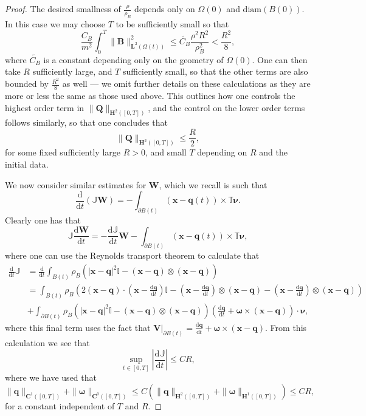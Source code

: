 \documentclass[a4paper]{amsart}
\numberwithin{equation}{section}
\theoremstyle{plain}
\newcommand{\mbf}[1]{\mathbf{#1}}
\newcommand{\mbb}[1]{\mathbb{#1}}
\begin{document}
\begin{proof}
    The desired smallness of $\frac{\rho}{\rho_B}$ depends only on $\Omega(0)$ and $\mathrm{diam}(B(0))$.
    In this case we may choose $T$ to be sufficiently small so that
    \[ \frac{C_B}{m^2} \int_{0}^{T} \|\mbf{B}\|_{\mbf{L}^2(\Omega(t))}^2 \leq \widetilde{C_B}\frac{\rho^2 R^2}{\rho_B^2}< \frac{R^2}{8},\]
    where $\widetilde{C_B}$ is a constant depending only on the geometry of $\Omega(0)$.
    One can then take $R$ sufficiently large, and $T$ sufficiently small, so that the other terms are also bounded by $\frac{R^2}{8}$ as well --- we omit further details on these calculations as they are more or less the same as those used above.
    This outlines how one controls the highest order term in $\|\mbf{Q}\|_{\mbf{H}^2([0,T])}$, and the control on the lower order terms follows similarly, so that one concludes that
    \[ \|\mbf{Q}\|_{\mbf{H}^2([0,T])} \leq \frac{R}{2}, \]
    for some fixed sufficiently large $R > 0$, and small $T$ depending on $R$ and the initial data.

    We now consider similar estimates for $\mbf{W}$, which we recall is such that
    \[\frac{\mathrm{d}}{\mathrm{d}t} \left( \mbb{J} \mbf{W} \right) = - \int_{\partial B(t)} (\mbf{x} - \mbf{q}(t)) \times \mbb{T} \boldsymbol{\nu}.\]
    Clearly one has that
    \[ \mbb{J} \frac{\mathrm{d}\mbf{W}}{\mathrm{d}t} = -\frac{\mathrm{d} \mbb{J}}{\mathrm{d}t} \mbf{W} - \int_{\partial B(t)} (\mbf{x} - \mbf{q}(t)) \times \mbb{T} \boldsymbol{\nu}, \]
    where one can use the Reynolds transport theorem to calculate that
    \begin{align*}
        \frac{\mathrm{d}}{\mathrm{d}t}\mbb{J} &= \frac{\mathrm{d}}{\mathrm{d}t}\int_{B(t)} \rho_B \left( |\mbf{x}-\mbf{q}|^2 \mbb{I} - (\mbf{x} - \mbf{q}) \otimes (\mbf{x} - \mbf{q}) \right)\\
		&=\int_{B(t)} \rho_B \left( 2\left(\mbf{x}-\mbf{q}\right)\cdot\left(\mbf{x}-\frac{\mathrm{d}\mbf{q}}{\mathrm{d}t}\right) \mbb{I} - \left(\mbf{x}-\frac{\mathrm{d}\mbf{q}}{\mathrm{d}t}\right) \otimes (\mbf{x} - \mbf{q}) - \left(\mbf{x}-\frac{\mathrm{d}\mbf{q}}{\mathrm{d}t}\right)\otimes \left(\mbf{x}-\mbf{q}\right) \right)\\
		&+ \int_{\partial B(t)} \rho_B \left( |\mbf{x}-\mbf{q}|^2 \mbb{I} - (\mbf{x} - \mbf{q}) \otimes (\mbf{x} - \mbf{q}) \right) \left( \frac{\mathrm{d}\mbf{q}}{\mathrm{d}t} + \boldsymbol{\omega} \times (\mbf{x} - \mbf{q}) \right) \cdot \boldsymbol{\nu}, 
    \end{align*}
    where this final term uses the fact that $\mbf{V}|_{\partial B(t)} =\frac{\mathrm{d}\mbf{q}}{\mathrm{d}t} + \boldsymbol{\omega} \times (\mbf{x} - \mbf{q}) . $
    From this calculation we see that 
    \[ \sup_{t \in [0,T]} \left| \frac{\mathrm{d} \mbb{J}}{\mathrm{d}t} \right| \leq C R, \]
    where we have used that
    \[ \| \mbf{q} \|_{\mbf{C}^1([0,T])} + \| \boldsymbol{\omega} \|_{\mbf{C}^0([0,T])} \leq C (\| \mbf{q} \|_{\mbf{H}^2([0,T])} + \| \boldsymbol{\omega} \|_{\mbf{H}^1([0,T])}) \leq C R,  \]
    for a constant independent of $T$ and $R$.


\end{proof}
\end{document}
